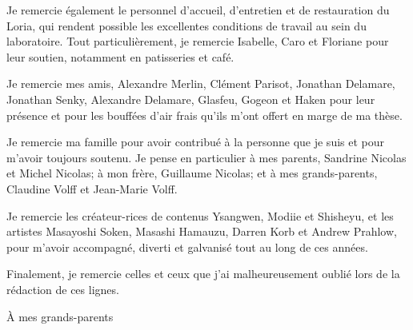 \documentclass[12pt]{thesul}
\theoremstyle{definition}
\begin{document}
\begin{ThesisAcknowledgments}
Je remercie également le personnel d'accueil, d'entretien et de restauration du Loria, qui rendent possible les excellentes conditions de travail au sein du laboratoire.
Tout particulièrement, je remercie Isabelle, Caro et Floriane pour leur soutien, notamment en patisseries et café.


Je remercie mes amis, Alexandre Merlin, Clément Parisot, Jonathan Delamare, Jonathan Senky, Alexandre Delamare, Glasfeu, Gogeon et Haken pour leur présence et pour les bouffées d'air frais qu'ils m'ont offert en marge de ma thèse.


Je remercie ma famille pour avoir contribué à la personne que je suis et pour m'avoir toujours soutenu. Je pense en particulier à mes parents, Sandrine Nicolas et Michel Nicolas; à mon frère, Guillaume Nicolas; et à mes grands-parents, Claudine Volff et Jean-Marie Volff.


Je remercie les créateur-rices de contenus Ysangwen, Modiie et Shisheyu, et les artistes Masayoshi Soken, Masashi Hamauzu, Darren Korb et Andrew Prahlow, pour m'avoir accompagné, diverti et galvanisé tout au long de ces années.


Finalement, je remercie celles et ceux que j'ai malheureusement oublié lors de la rédaction de ces lignes.

\end{ThesisAcknowledgments}


\begin{ThesisDedication}
À mes grands-parents
\end{ThesisDedication}



\WritePartLabelInToc
\WriteChapterLabelInToc


\tableofcontents

\end{document}
